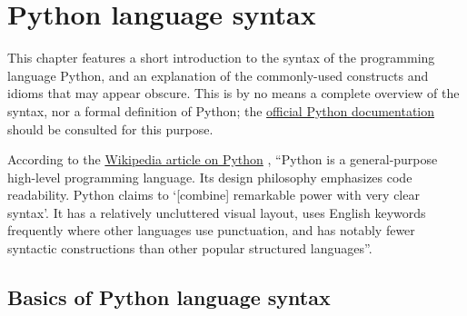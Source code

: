 \chapter{Python language syntax}
\label{chap:python}

\lstset{numbers=none}%

This chapter features a short introduction to the syntax of the
programming language Python, and an explanation of the commonly-used
constructs and idioms that may appear obscure.  This is by no means a
complete overview of the syntax, nor a formal definition of Python;
the \href{http://docs.python.org/3.1/}{official Python documentation}
\cite{python:docs, python:reference} should be consulted for this
purpose.

According to the
\href{http://en.wikipedia.org/wiki/Python_(programming_language)}
{Wikipedia article on Python} \cite{wikipedia:python}, ``Python is a
general-purpose high-level programming language. Its design philosophy
emphasizes code readability. Python claims to `[combine] remarkable
power with very clear syntax'. It has a relatively uncluttered visual
layout, uses English keywords frequently where other languages use
punctuation, and has notably fewer syntactic constructions than other
popular structured languages''.


\section{Basics of Python language syntax}
\label{sec:syntax}

